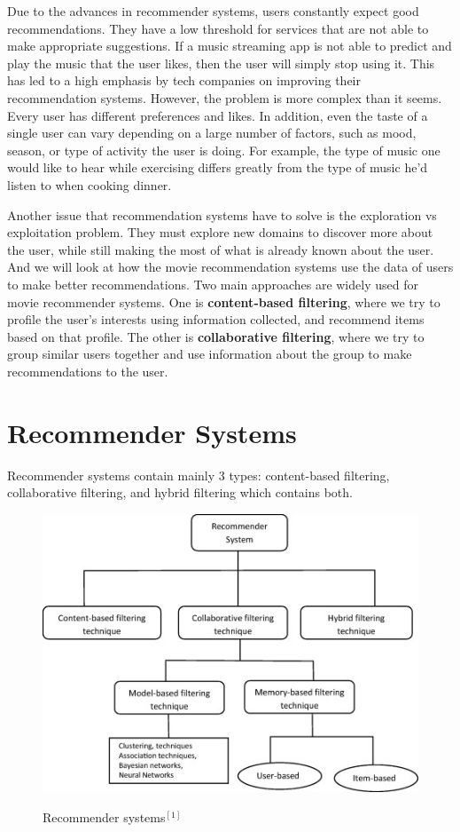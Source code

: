 \documentclass[onecolumn]{article}
\begin{document}
Due to the advances in recommender systems, users constantly expect good recommendations. They have a low threshold for services that are not able to make appropriate suggestions. If a music streaming app is not able to predict and play the music that the user likes, then the user will simply stop using it. This has led to a high emphasis by tech companies on improving their recommendation systems. However, the problem is more complex than it seems. Every user has different preferences and likes. In addition, even the taste of a single user can vary depending on a large number of factors, such as mood, season, or type of activity the user is doing. For example, the type of music one would like to hear while exercising differs greatly from the type of music he’d listen to when cooking dinner.
\vspace{4mm}

Another issue that recommendation systems have to solve is the exploration vs exploitation problem. They must explore new domains to discover more about the user, while still making the most of what is already known about the user. And we will look at how the movie recommendation systems use the data of users to make better recommendations. Two main approaches are widely used for movie recommender systems. One is \textbf{content-based filtering}, where we try to profile the user's interests using information collected, and recommend items based on that profile. The other is \textbf{collaborative filtering}, where we try to group similar users together and use information about the group to make recommendations to the user.


\hfill

\section{\textbf{Recommender Systems}}
\vspace{2mm}
\hspace{0.5cm}Recommender systems contain mainly 3 types: content-based filtering, collaborative filtering, and hybrid filtering which contains both. 

\hfill

\begin{figure}[h!t]
\centering
{\centering
    \includegraphics[width=0.7\linewidth]{figures/figure1.jpg}}        
\caption{Recommender systems${^{[1]}}$}
\end{figure}
\hfill
\end{document}

